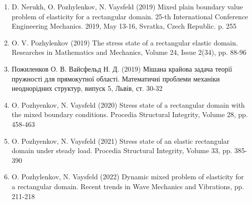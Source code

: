 \begin{enumerate}
    \item D. Nerukh, O. Pozhylenkov, N. Vaysfeld (2019) Mixed plain boundary value problem of elasticity for a rectangular domain.
    25-th International Conference Engineering Mechanics. 2019, May 13-16, Svratka, Czech Republic. p. 255
    \item O. V. Pozhylenkov (2019) The stress state of a rectangular elastic domain. Researches in Mathematics and Mechanics, Volume 24, Issue 2(34), pp. 88-96
    \item Пожиленков О. В. Вайсфельд Н. Д. (2019) Мішана крайова задача теорії пружності для прямокутної області. Математичні проблеми механіки неоднорідних структур, випуск 5, Львів, ст. 30-32
    \item O. Pozhyenkov, N. Vaysfeld (2020) Stress state of a rectangular domain with the mixed boundary conditions. Procedia Structural Integrity, Volume 28, pp. 458-463
    \item O. Pozhyenkov, N. Vaysfeld (2021) Stress state of an elastic rectangular domain under steady load. Procedia Structural Integrity, Volume 33, pp. 385-390
    \item O. Pozhylenkov, N. Vaysfeld (2022) Dynamic mixed problem of elasticity for a rectangular domain. Recent trends in Wave Mechanics and Vibrations, pp. 211-218
\end{enumerate}